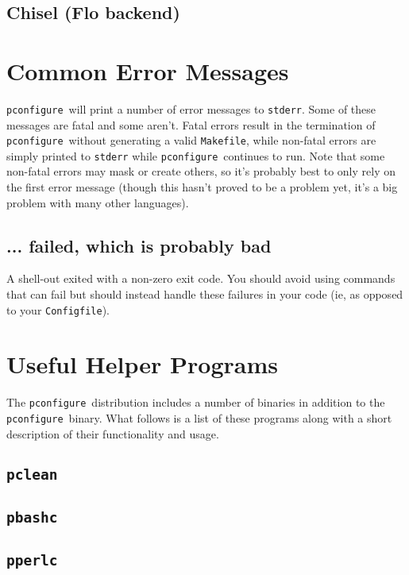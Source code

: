 \documentclass{article}
\newcommand{\pconfigure}{\texttt{pconfigure}}
\begin{document}
\subsection{Chisel (Flo backend)}

\section{Common Error Messages \label{err}}

\pconfigure\ will print a number of error messages to \texttt{stderr}.
Some of these messages are fatal and some aren't.  Fatal errors result
in the termination of \pconfigure\ without generating a valid
\texttt{Makefile}, while non-fatal errors are simply printed to
\texttt{stderr} while \pconfigure\ continues to run.  Note that some
non-fatal errors may mask or create others, so it's probably best to
only rely on the first error message (though this hasn't proved to be
a problem yet, it's a big problem with many other languages). %

\subsection{... failed, which is probably bad}

A shell-out exited with a non-zero exit code.  You should avoid using
commands that can fail but should instead handle these failures in
your code (ie, as opposed to your \texttt{Configfile}).

\section{Useful Helper Programs \label{prog}}

The \pconfigure\ distribution includes a number of binaries in
addition to the \pconfigure\ binary.  What follows is a list of these
programs along with a short description of their functionality and
usage.

\subsection{\texttt{pclean}}

\subsection{\texttt{pbashc}}

\subsection{\texttt{pperlc}}
\end{document}

